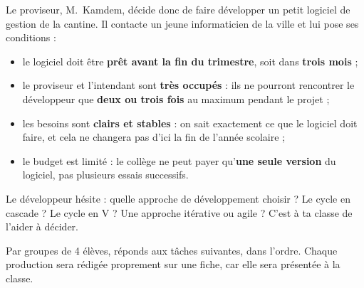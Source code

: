 \documentclass[11pt]{article}
\newcounter{popsec}
\newcounter{popsub}
\newcommand{\courssub}[1]{%
  \stepcounter{popsub}%
  \par\vspace{9pt}\noindent{\popxbold\fontsize{11.5}{13}\selectfont\color{popink}{\color{poporange}\thepopsec.\thepopsub}\hspace{6pt}#1}\par\nopagebreak\vspace{4pt}
}
\begin{document}
Le proviseur, M.\ Kamdem, décide donc de faire développer un petit logiciel de gestion de la cantine. Il contacte un jeune informaticien de la ville et lui pose ses conditions :

\begin{itemize}
  \item le logiciel doit être \textbf{prêt avant la fin du trimestre}, soit dans \textbf{trois mois} ;
  \item le proviseur et l'intendant sont \textbf{très occupés} : ils ne pourront rencontrer le développeur que \textbf{deux ou trois fois} au maximum pendant le projet ;
  \item les besoins sont \textbf{clairs et stables} : on sait exactement ce que le logiciel doit faire, et cela ne changera pas d'ici la fin de l'année scolaire ;
  \item le budget est limité : le collège ne peut payer qu'\textbf{une seule version} du logiciel, pas plusieurs essais successifs.
\end{itemize}

Le développeur hésite : quelle approche de développement choisir ? Le cycle en cascade ? Le cycle en V ? Une approche itérative ou agile ? C'est à ta classe de l'aider à décider.

\courssub{Consignes}

Par groupes de 4 élèves, réponds aux tâches suivantes, dans l'ordre. Chaque production sera rédigée proprement sur une fiche, car elle sera présentée à la classe.
\end{document}
